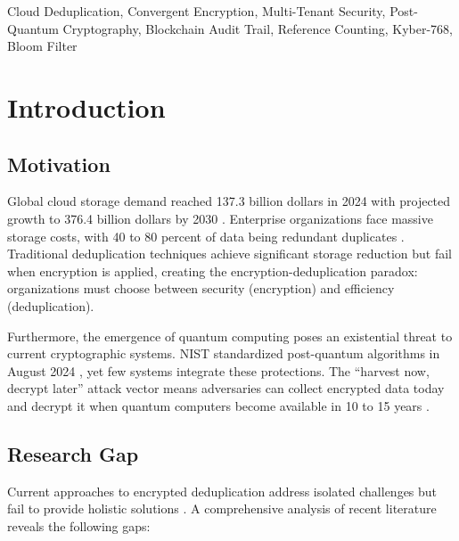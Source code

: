 \documentclass[conference]{IEEEtran}
\begin{document}
\begin{IEEEkeywords}
Cloud Deduplication, Convergent Encryption, Multi-Tenant Security, Post-Quantum Cryptography, Blockchain Audit Trail, Reference Counting, Kyber-768, Bloom Filter
\end{IEEEkeywords}

\section{Introduction}
\subsection{Motivation}
Global cloud storage demand reached 137.3 billion dollars in 2024 with projected growth to 376.4 billion dollars by 2030 \cite{r1}. Enterprise organizations face massive storage costs, with 40 to 80 percent of data being redundant duplicates \cite{r2}. Traditional deduplication techniques achieve significant storage reduction but fail when encryption is applied, creating the encryption-deduplication paradox: organizations must choose between security (encryption) and efficiency (deduplication).

Furthermore, the emergence of quantum computing poses an existential threat to current cryptographic systems. NIST standardized post-quantum algorithms in August 2024 \cite{r3}, yet few systems integrate these protections. The ``harvest now, decrypt later'' attack vector means adversaries can collect encrypted data today and decrypt it when quantum computers become available in 10 to 15 years \cite{r4}.

\subsection{Research Gap}
Current approaches to encrypted deduplication address isolated challenges but fail to provide holistic solutions \cite{r5}. A comprehensive analysis of recent literature reveals the following gaps:
\end{document}
